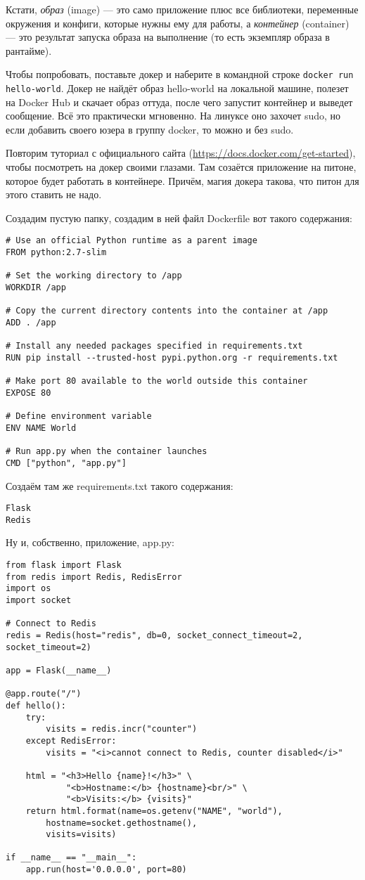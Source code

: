 \documentclass[a5paper]{article}
\begin{document}
Кстати, \textit{образ} (image) --- это само приложение плюс все библиотеки, переменные окружения и конфиги, которые нужны ему для работы, а \textit{контейнер} (container) --- это результат запуска образа 
на выполнение (то есть экземпляр образа в рантайме).

Чтобы попробовать, поставьте докер и наберите в командной строке \verb|docker run hello-world|. Докер не найдёт образ hello-world на локальной машине, полезет на Docker Hub и скачает образ оттуда,
после чего запустит контейнер и выведет сообщение. Всё это практически мгновенно. На линуксе оно захочет sudo, но если добавить своего юзера в группу docker, то можно и без sudo.

Повторим туториал с официального сайта (\url{https://docs.docker.com/get-started}), чтобы посмотреть на докер своими глазами. Там созаётся приложение на питоне, которое будет работать в контейнере. Причём, магия
докера такова, что питон для этого ставить не надо.

Создадим пустую папку, создадим в ней файл Dockerfile вот такого содержания:
\begin{verbatim}
# Use an official Python runtime as a parent image
FROM python:2.7-slim

# Set the working directory to /app
WORKDIR /app

# Copy the current directory contents into the container at /app
ADD . /app

# Install any needed packages specified in requirements.txt
RUN pip install --trusted-host pypi.python.org -r requirements.txt

# Make port 80 available to the world outside this container
EXPOSE 80

# Define environment variable
ENV NAME World

# Run app.py when the container launches
CMD ["python", "app.py"]
\end{verbatim}

Создаём там же requirements.txt такого содержания:
\begin{verbatim}
Flask
Redis
\end{verbatim}

Ну и, собственно, приложение, app.py:
\begin{verbatim}
from flask import Flask
from redis import Redis, RedisError
import os
import socket

# Connect to Redis
redis = Redis(host="redis", db=0, socket_connect_timeout=2, socket_timeout=2)

app = Flask(__name__)

@app.route("/")
def hello():
    try:
        visits = redis.incr("counter")
    except RedisError:
        visits = "<i>cannot connect to Redis, counter disabled</i>"

    html = "<h3>Hello {name}!</h3>" \
            "<b>Hostname:</b> {hostname}<br/>" \
            "<b>Visits:</b> {visits}"
    return html.format(name=os.getenv("NAME", "world"), 
        hostname=socket.gethostname(), 
        visits=visits)

if __name__ == "__main__":
    app.run(host='0.0.0.0', port=80)
\end{verbatim}
\end{document}
